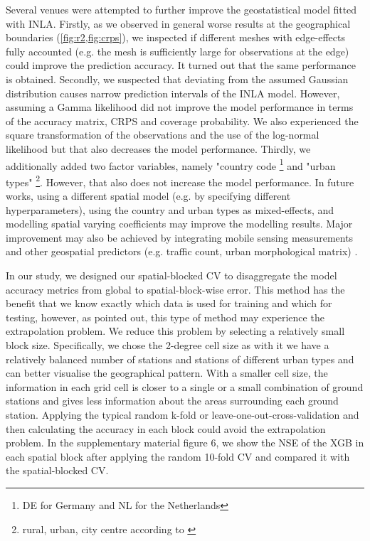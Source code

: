 \documentclass{article}
\begin{document}
Several venues were attempted to further improve the geostatistical model fitted with INLA. Firstly, as we observed in general worse results at the geographical boundaries (\cref{fig:r2,fig:crps}), we inspected if different meshes with edge-effects fully accounted (e.g. the mesh is sufficiently large for observations at the edge) could improve the prediction accuracy. It turned out that the same performance is obtained. Secondly, we suspected that deviating from the assumed Gaussian distribution causes narrow prediction intervals of the INLA model. However, assuming a Gamma likelihood did not improve the model performance in terms of the accuracy matrix, CRPS and coverage probability. We also experienced the square transformation of the observations and the use of the log-normal likelihood but that also decreases the model performance. Thirdly, we additionally added two factor variables, namely "country code \footnote{DE for Germany and NL for the Netherlands} and "urban types" \footnote{rural, urban, city centre according to \citep{urbantype}}. However, that also does not increase the model performance. In future works, using a different spatial model (e.g. by specifying different hyperparameters), using the country and urban types as mixed-effects, and modelling spatial varying coefficients may improve the modelling results. Major improvement may also be achieved by integrating mobile sensing measurements and other geospatial predictors (e.g. traffic count, urban morphological matrix) \citep{moragaetal17}.

 

In our study, we designed our spatial-blocked CV to disaggregate the model accuracy metrics from global to spatial-block-wise error. This method has the benefit that we know exactly which data is used for training and which for testing, however, as \cite{wadoux2021spatial} pointed out, this type of method may experience the extrapolation problem. We reduce this problem by selecting a relatively small block size. Specifically, we chose the 2-degree cell size as with it we have a relatively balanced number of stations and stations of different urban types and can better visualise the geographical pattern. With a smaller cell size, the information in each grid cell is closer to a single or a small combination of ground stations and gives less information about the areas surrounding each ground station. Applying the typical random k-fold or leave-one-out-cross-validation and then calculating the accuracy in each block could avoid the extrapolation problem. In the supplementary material figure 6, we show the NSE of the XGB in each spatial block after applying the random 10-fold CV and compared it with the spatial-blocked CV. 
 
\end{document}
